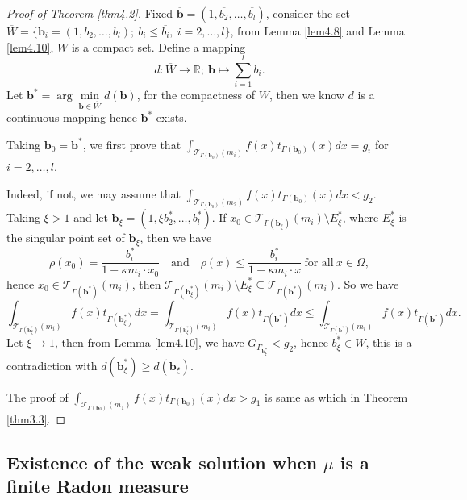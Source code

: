 \documentclass[a4paper,12pt,]{article}
\numberwithin{equation}{section}
\numberwithin{equation}{section} \allowdisplaybreaks
\begin{document}
\begin{proof}[Proof of Theorem \ref{thm4.2}]
  Fixed $\overline{\mathbf{b}} = (1,\overline{b_{2}},\ldots,\overline{b_{l}})$, consider the set $\overline{W} = \{\mathbf{b}_{i} = (1,b_{2},\ldots,b_{l});~
    b_{i} \leq \overline{b_{i}},~ i=2,\ldots,l\}$, from Lemma \ref{lem4.8} and Lemma \ref{lem4.10}, $W$ is a compact set. Define a mapping
  $$d:\overline{W}\rightarrow \mathbb{R};~\mathbf{b} \mapsto \sum_{i=1}^{l}b_{i}.$$
  Let $\mathbf{b}^{\ast} = \arg\min\limits_{\mathbf{b}\in \overline{W}}d(\mathbf{b})$, for the compactness of $\overline{W}$, then we know $d$ is a continuous mapping hence $\mathbf{b}^{\ast}$ exists.

  Taking $\mathbf{b}_{0} = \mathbf{b}^{\ast}$, we first prove that $\displaystyle\int_{\mathcal{T}_{\Gamma(\mathbf{b}_{0})}(m_{i})}f(x)t_{\Gamma(\mathbf{b}_{0})}(x)dx = g_{i}$ for $i = 2,\ldots,l$.

  Indeed, if not, we may assume that $\displaystyle\int_{\mathcal{T}_{\Gamma(\mathbf{b}_{0})}(m_{2})}f(x)t_{\Gamma(\mathbf{b}_{0})}(x)dx < g_{2}.$ Taking $\xi >1$ and let $\mathbf{b}_{\xi} = (1,\xi b_{2}^{\ast},\ldots, b_{l}^{\ast})$. If $x_{0} \in \mathcal{T}_{\Gamma(\mathbf{b}_{\xi})}(m_{i}) \setminus E_{\xi}^{\ast}$, where $E_{\xi}^{\ast}$ is the singular point set of $\mathbf{b}_{\xi}$, then we have
  $$\rho(x_{0}) = \frac{b_{i}^{\ast}}{1 - \kappa m_{i} \cdot x_{0}} \quad \text{and} \quad \rho(x) \leq \frac{b_{i}^{\ast}}{1 - \kappa m_{i} \cdot x}~\text{for all}~x\in \bar{\Omega},$$
  hence $x_{0} \in \mathcal{T}_{\Gamma(\mathbf{b}^{\ast})}(m_{i})$, then $\mathcal{T}_{\Gamma(\mathbf{b}_{\xi}^{\ast})}(m_{i}) \setminus E_{\xi}^{\ast} \subseteq \mathcal{T}_{\Gamma(\mathbf{b}^{\ast})}(m_{i})$. So we have
  $$\int_{\mathcal{T}_{\Gamma(\mathbf{b}_{\xi}^{\ast})}(m_{i})}f(x)t_{\Gamma(\mathbf{b}_{\xi}^{\ast})}dx = \int_{\mathcal{T}_{\Gamma(\mathbf{b}_{\xi}^{\ast})}(m_{i})}f(x)t_{\Gamma(\mathbf{b}^{\ast})}dx \leq \int_{\mathcal{T}_{\Gamma(\mathbf{b}^{\ast})}(m_{i})}f(x)t_{\Gamma(\mathbf{b}^{\ast})}dx.$$
  Let $\xi \rightarrow 1$, then from Lemma \ref{lem4.10}, we have $G_{\Gamma_{\mathbf{b}_{\xi}^{\ast}}} < g_{2}$, hence $b_{\xi}^{\ast} \in W$, this is a contradiction with $d(\mathbf{b}_{\xi}^{\ast}) \geq d(\mathbf{b}_{\xi})$.
  
  The proof of $\displaystyle\int_{\mathcal{T}_{\Gamma(\mathbf{b}_{0})}(m_{1})}f(x)t_{\Gamma(\mathbf{b}_{0})}(x)dx > g_{1}$ is same as which in Theorem \ref{thm3.3}. 
     \end{proof}


\subsection{Existence of the weak solution when $\mu$ is a finite Radon measure}
\end{document}
